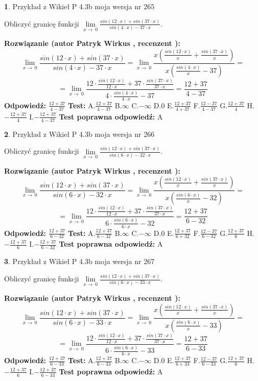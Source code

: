 \documentclass[12pt, a4paper]{article}
\theoremstyle{definition} %
\newtheorem{zad}{}
\newcommand{\zadStart}[1]{\begin{zad}#1\newline}
\newcommand{\zadStop}{\end{zad}}
\newcommand{\rozwStart}[2]{\noindent \textbf{Rozwiązanie (autor #1 , recenzent #2): }\newline}
\newcommand{\rozwStop}{\newline}
\newcommand{\odpStart}{\noindent \textbf{Odpowiedź:}\newline}
\newcommand{\odpStop}{\newline}
\newcommand{\testStart}{\noindent \textbf{Test:}\newline}
\newcommand{\testStop}{\newline}
\newcommand{\kluczStart}{\noindent \textbf{Test poprawna odpowiedź:}\newline}
\newcommand{\kluczStop}{\newline}
\begin{document}
\zadStart{Przykład z Wikieł P 4.3b moja wersja nr 265}


Obliczyć granicę funkcji $\lim\limits_{x\to\ 0}\frac{sin(12 \cdot x)+sin(37 \cdot x)}{sin(4 \cdot x)-37 \cdot x}$.
\zadStop
\rozwStart{Patryk Wirkus}{}
$$\lim\limits_{x\to\ 0}\frac{sin(12 \cdot x)+sin(37 \cdot x)}{sin(4 \cdot x)-37 \cdot x}=\lim\limits_{x\to\ 0}\frac{x(\frac{sin(12 \cdot x)}{x}+\frac{sin(37 \cdot x)}{x})}{x(\frac{sin(4 \cdot x)}{x}-37)}=$$
$$=\lim\limits_{x\to\ 0}\frac{12 \cdot \frac{sin(12 \cdot x)}{12 \cdot x}+37 \cdot \frac{sin(37 \cdot x)}{37 \cdot x}}{4 \cdot \frac{sin(4 \cdot x)}{4 \cdot x}-37}=\frac{12+37}{4-37}$$
\rozwStop
\odpStart
$\frac{12+37}{4-37}$
\odpStop
\testStart
A.$\frac{12+37}{4-37}$
B.$\infty$
C.$-\infty$
D.$0$
E.$\frac{12+37}{4+37}$
F.$\frac{12-37}{4-37}$
G.$\frac{12+37}{4}$
H.$-\frac{12+37}{4}$
I.$-\frac{12+37}{4-37}$
\testStop
\kluczStart
A
\kluczStop



\zadStart{Przykład z Wikieł P 4.3b moja wersja nr 266}


Obliczyć granicę funkcji $\lim\limits_{x\to\ 0}\frac{sin(12 \cdot x)+sin(37 \cdot x)}{sin(6 \cdot x)-32 \cdot x}$.
\zadStop
\rozwStart{Patryk Wirkus}{}
$$\lim\limits_{x\to\ 0}\frac{sin(12 \cdot x)+sin(37 \cdot x)}{sin(6 \cdot x)-32 \cdot x}=\lim\limits_{x\to\ 0}\frac{x(\frac{sin(12 \cdot x)}{x}+\frac{sin(37 \cdot x)}{x})}{x(\frac{sin(6 \cdot x)}{x}-32)}=$$
$$=\lim\limits_{x\to\ 0}\frac{12 \cdot \frac{sin(12 \cdot x)}{12 \cdot x}+37 \cdot \frac{sin(37 \cdot x)}{37 \cdot x}}{6 \cdot \frac{sin(6 \cdot x)}{6 \cdot x}-32}=\frac{12+37}{6-32}$$
\rozwStop
\odpStart
$\frac{12+37}{6-32}$
\odpStop
\testStart
A.$\frac{12+37}{6-32}$
B.$\infty$
C.$-\infty$
D.$0$
E.$\frac{12+37}{6+32}$
F.$\frac{12-37}{6-32}$
G.$\frac{12+37}{6}$
H.$-\frac{12+37}{6}$
I.$-\frac{12+37}{6-32}$
\testStop
\kluczStart
A
\kluczStop



\zadStart{Przykład z Wikieł P 4.3b moja wersja nr 267}


Obliczyć granicę funkcji $\lim\limits_{x\to\ 0}\frac{sin(12 \cdot x)+sin(37 \cdot x)}{sin(6 \cdot x)-33 \cdot x}$.
\zadStop
\rozwStart{Patryk Wirkus}{}
$$\lim\limits_{x\to\ 0}\frac{sin(12 \cdot x)+sin(37 \cdot x)}{sin(6 \cdot x)-33 \cdot x}=\lim\limits_{x\to\ 0}\frac{x(\frac{sin(12 \cdot x)}{x}+\frac{sin(37 \cdot x)}{x})}{x(\frac{sin(6 \cdot x)}{x}-33)}=$$
$$=\lim\limits_{x\to\ 0}\frac{12 \cdot \frac{sin(12 \cdot x)}{12 \cdot x}+37 \cdot \frac{sin(37 \cdot x)}{37 \cdot x}}{6 \cdot \frac{sin(6 \cdot x)}{6 \cdot x}-33}=\frac{12+37}{6-33}$$
\rozwStop
\odpStart
$\frac{12+37}{6-33}$
\odpStop
\testStart
A.$\frac{12+37}{6-33}$
B.$\infty$
C.$-\infty$
D.$0$
E.$\frac{12+37}{6+33}$
F.$\frac{12-37}{6-33}$
G.$\frac{12+37}{6}$
H.$-\frac{12+37}{6}$
I.$-\frac{12+37}{6-33}$
\testStop
\kluczStart
A
\kluczStop
\end{document}
